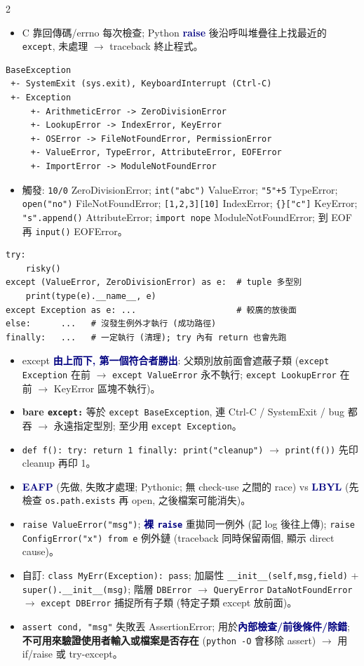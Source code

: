 \documentclass[12pt]{extarticle}
\newcommand{\py}{\lstinline[language={},basicstyle=\ttfamily\fontsize{10.5}{13}\selectfont\bfseries,backgroundcolor=\color{white}]}
\renewcommand{\sec}[1]{\par\vspace{3pt}\noindent{\setlength{\fboxsep}{2pt}\colorbox{navy}{\parbox{\dimexpr\linewidth-4pt}{\color{white}\bfseries\fontsize{13}{16}\selectfont #1}}}\par\vspace{2pt}}
\newcommand{\sub}[1]{\textcolor{navy}{\textbf{#1}}}
\newcommand{\warn}[1]{\textcolor{warn}{\textbf{#1}}}
\newcommand{\ra}{$\rightarrow$}
\newenvironment{bl}{\begin{itemize}[leftmargin=10pt,itemsep=1pt,parsep=0pt,topsep=1pt,partopsep=0pt,labelsep=3pt,label={\textbullet}]}{\end{itemize}}
\begin{document}
\begin{multicols*}{2}
\sec{20. 例外處理}
\begin{bl}
\item C 靠回傳碼/errno 每次檢查; Python \sub{raise} 後沿呼叫堆疊往上找最近的 \py|except|, 未處理 \ra{} traceback 終止程式。
\end{bl}
\begin{lstlisting}
BaseException
 +- SystemExit (sys.exit), KeyboardInterrupt (Ctrl-C)
 +- Exception
     +- ArithmeticError -> ZeroDivisionError
     +- LookupError -> IndexError, KeyError
     +- OSError -> FileNotFoundError, PermissionError
     +- ValueError, TypeError, AttributeError, EOFError
     +- ImportError -> ModuleNotFoundError
\end{lstlisting}
\begin{bl}
\item 觸發: \py|10/0| ZeroDivisionError; \py|int("abc")| ValueError; \py|"5"+5| TypeError; \py|open("no")| FileNotFoundError; \py|[1,2,3][10]| IndexError; \py|{}["c"]| KeyError; \py|"s".append()| AttributeError; \py|import nope| ModuleNotFoundError; 到 EOF 再 \py|input()| EOFError。
\end{bl}
\begin{lstlisting}
try:
    risky()
except (ValueError, ZeroDivisionError) as e:  # tuple 多型別
    print(type(e).__name__, e)
except Exception as e: ...                    # 較廣的放後面
else:      ...   # 沒發生例外才執行 (成功路徑)
finally:   ...   # 一定執行 (清理); try 內有 return 也會先跑
\end{lstlisting}
\begin{bl}
\item except \sub{由上而下, 第一個符合者勝出}: 父類別放前面會遮蔽子類 (\py|except Exception| 在前 \ra{} \py|except ValueError| 永不執行; \py|except LookupError| 在前 \ra{} KeyError 區塊不執行)。
\item \warn{bare \texttt{except:}} 等於 \py|except BaseException|, 連 Ctrl-C / SystemExit / bug 都吞 \ra{} 永遠指定型別; 至少用 \py|except Exception|。
\item \py|def f(): try: return 1 finally: print("cleanup")| \ra{} \py|print(f())| 先印 cleanup 再印 1。
\item \sub{EAFP} (先做, 失敗才處理; Pythonic; 無 check-use 之間的 race) vs \sub{LBYL} (先檢查 \py|os.path.exists| 再 open, 之後檔案可能消失)。
\item \py|raise ValueError("msg")|; \sub{裸 \texttt{raise}} 重拋同一例外 (記 log 後往上傳); \py|raise ConfigError("x") from e| 例外鏈 (traceback 同時保留兩個, 顯示 direct cause)。
\item 自訂: \py|class MyErr(Exception): pass|; 加屬性 \py|__init__(self,msg,field)| + \py|super().__init__(msg)|; 階層 \py|DBError| $\to$ \py|QueryError| \py|DataNotFoundError| \ra{} \py|except DBError| 捕捉所有子類 (特定子類 except 放前面)。
\item \py|assert cond, "msg"| 失敗丟 AssertionError; 用於\sub{內部檢查/前後條件/除錯}; \warn{不可用來驗證使用者輸入或檔案是否存在} (\py|python -O| 會移除 assert) \ra{} 用 if/raise 或 try-except。
\end{bl}


\end{multicols*}
\end{document}
